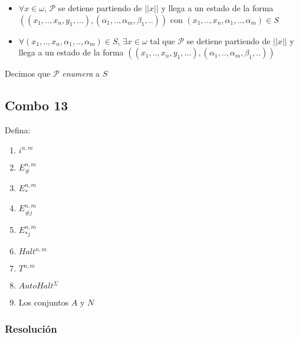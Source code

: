 \documentclass[
]{article}
\providecommand{\tightlist}{%
  \setlength{\itemsep}{0pt}\setlength{\parskip}{0pt}}
\begin{document}
\begin{itemize}
\begin{itemize}
    \begin{itemize}
    \tightlist
    \item
      \(\forall x\in\omega\), \(\mathcal{P}\) se detiene partiendo de
      \(||x||\) y llega a un estado de la forma
      \(((x_1, .., x_n, y_1, ...) , (\alpha_1, .., \alpha_m, \beta_1, ..))\)
      con \((x_1, .., x_n, \alpha_1, .., \alpha_m)\in S\)
    \item
      \(\forall (x_1, .., x_n, \alpha_1, .., \alpha_m)\in S\),
      \(\exists x\in\omega\) tal que \(\mathcal{P}\) se detiene
      partiendo de \(||x||\) y llega a un estado de la forma
      \(((x_1, .., x_n, y_1, ...) , (\alpha_1, .., \alpha_m, \beta_1, ..))\)
    \end{itemize}
  \end{itemize}

  Decimos que \(\mathcal{P}\) \emph{enumera} a \(S\)
\end{itemize}

\subsection{Combo 13}\label{combo-13}

Defina:

\begin{enumerate}
\def\labelenumi{\arabic{enumi}.}
\tightlist
\item
  \(i^{n,m}\)
\item
  \(E_\#^{n,m}\)
\item
  \(E_*^{n,m}\)
\item
  \(E_{\#j}^{n,m}\)
\item
  \(E_{*j}^{n,m}\)
\item
  \(Halt^{n,m}\)
\item
  \(T^{n,m}\)
\item
  \(AutoHalt^\Sigma\)
\item
  Los conjuntos \(A\) y \(N\)
\end{enumerate}

\subsubsection{Resolución}\label{resoluciuxf3n-12}
\end{document}
